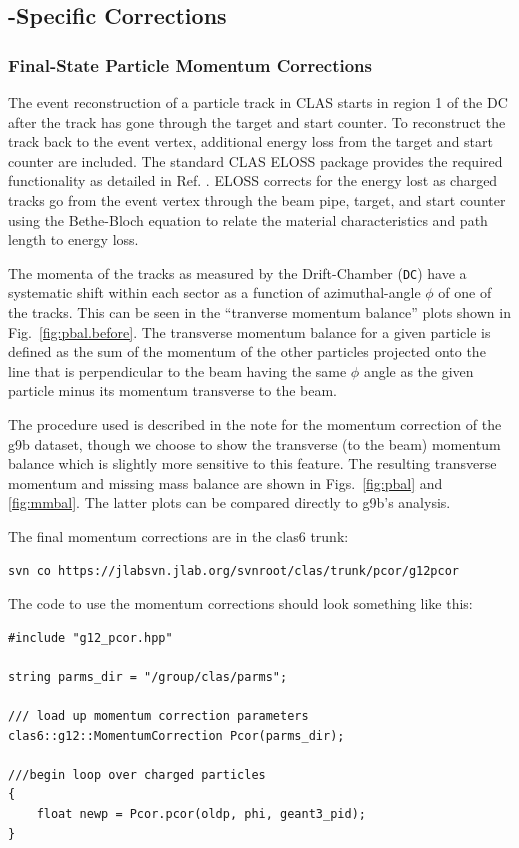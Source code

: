 \subsection{\label{sec:corrections}-Specific Corrections}

\subsubsection{\label{sec:corrections.pcor}Final-State Particle Momentum Corrections}

The event reconstruction of a particle track in CLAS starts in region 1 of the DC after the track has gone through the target and start counter. To reconstruct the track back to the event vertex, additional energy loss from the target and start counter are included. The standard CLAS ELOSS package provides the required functionality as detailed in Ref. \cite{eloss}. ELOSS corrects for the energy lost as charged tracks go from the event vertex through the beam pipe, target, and start counter using the Bethe-Bloch equation \cite{pdg} to relate the material characteristics and path length to energy loss.

The momenta of the tracks as measured by the Drift-Chamber (\texttt{DC}) have a systematic shift within each sector as a function of azimuthal-angle $\phi$ of one of the tracks. This can be seen in the ``tranverse momentum balance'' plots shown in Fig.~\ref{fig:pbal.before}. The transverse momentum balance for a given particle is defined as the sum of the momentum of the other particles projected onto the line that is perpendicular to the beam having the same $\phi$ angle as the given particle minus its momentum transverse to the beam.

The procedure used is described in the  note for the momentum correction of the g9b dataset\cite{clas.note.g9bpcor}, though we choose to show the transverse (to the beam) momentum balance which is slightly more sensitive to this feature. The resulting transverse momentum and missing mass balance are shown in Figs.~\ref{fig:pbal} and \ref{fig:mmbal}. The latter plots can be compared directly to g9b's analysis.

The final  momentum corrections are in the clas6 trunk:
\begin{verbatim}
svn co https://jlabsvn.jlab.org/svnroot/clas/trunk/pcor/g12pcor
\end{verbatim}


The code to use the momentum corrections should look something like this:
\begin{verbatim}
#include "g12_pcor.hpp"

string parms_dir = "/group/clas/parms";

/// load up momentum correction parameters
clas6::g12::MomentumCorrection Pcor(parms_dir);

///begin loop over charged particles
{
    float newp = Pcor.pcor(oldp, phi, geant3_pid);
}
\end{verbatim}

